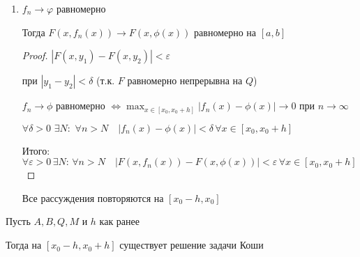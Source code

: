 \begin{properties}
\begin{enumerate}
\begin{proof}
			$\psi'(x) = F(x_k, y_k)$ для $x \in [x_k, x_{k+1}]$

			$\psi'(x) = |F(x_k, \psi(x_k)) - F(x, \psi(x))| < \varepsilon$ 

			Надо доказать, что разность аргументов $F(x_k, \psi(x_k))$ и $F(x, \psi(x)$ меньше, чем $\delta_1$

			$|x_k - x| < \delta \leqslant \delta_1;\,\,|\psi(x_k) - \psi(x)| < |\psi(x_k) - \psi(x_{k+1})| < M \cdot \delta \leqslant \delta_1$

		\end{proof}

		\item
		$f_n \to \varphi$ равномерно

		Тогда $F(x, f_n(x)) \to F(x, \phi(x))$ равномерно на $[a, b]$

		\begin{proof}\thmslashn

			$|F(x, y_1) - F(x, y_2)| < \varepsilon$

			при $|y_1 - y_2| < \delta$ (т.к. $F$ равномерно непрерывна на $Q$)

			$f_n \to \phi$ равномерно $\Leftrightarrow \max_{x\in[x_0, x_0 + h]} |f_n(x) - \phi(x)| \to 0$ при $n \to \infty$

			$\forall \delta > 0\,\, \exists N: \,\, \forall n > N\quad |f_n(x) - \phi(x)| < \delta\, \forall x \in [x_0, x_0 + h]$

			Итого: $\forall \varepsilon > 0\, \exists N: \, \forall n > N\quad |F(x, f_n(x)) - F(x, \phi(x))| < \varepsilon \, \forall x \in [x_0, x_0 + h]$

		\end{proof}

		\begin{remark}\thmslashn

			Все рассуждения повторяются на $[x_0 - h, x_0]$

		\end{remark}
	\end{enumerate}
\end{properties}

\begin{theorem}[Пеано]\thmslashn 

	Пусть $A, B, Q, M$ и $h$ как ранее
	
	Тогда на $[x_0 - h, x_0 + h]$ существует решение задачи Коши

\end{theorem}


